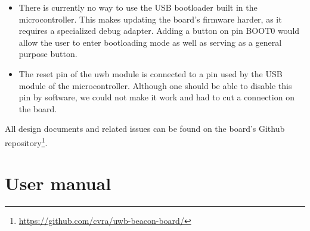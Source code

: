 \documentclass[a4paper, 12pt]{scrreprt}
\begin{document}
\begin{itemize}
    \item There is currently no way to use the USB bootloader built in the microcontroller.
        This makes updating the board's firmware harder, as it requires a specialized debug adapter.
        Adding a button on pin BOOT0 would allow the user to enter bootloading mode as well as serving as a general purpose button.
    \item The reset pin of the \gls{uwb} module is connected to a pin used by the USB module of the microcontroller.
        Although one should be able to disable this pin by software, we could not make it work and had to cut a connection on the board.
\end{itemize}

All design documents and related issues can be found on the board's Github repository\footnote{\url{https://github.com/cvra/uwb-beacon-board/}}.




\chapter{User manual}


\clearpage
\nocite{*} %


\end{document}
